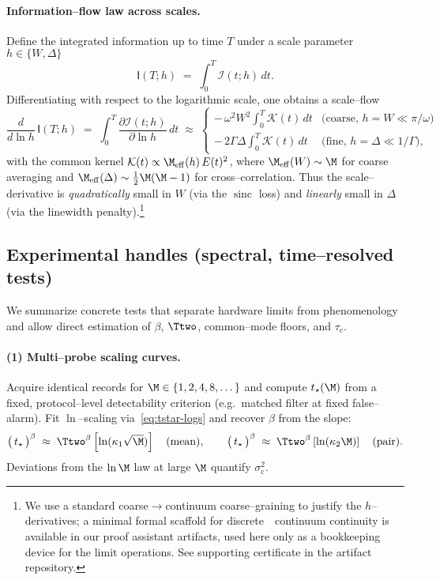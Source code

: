 \documentclass[12pt,a4paper]{article}
\theoremstyle{definition}
\theoremstyle{remark}
\begin{document}
\paragraph{Information--flow law across scales.}
Define the integrated information up to time \(T\) under a scale parameter \(h\in\{W,\Delta\}\)
\begin{equation}
\mathsf{I}(T;h)
\;=\;
\int_0^T \mathcal{I}(t;h)\,dt.
\end{equation}
Differentiating with respect to the logarithmic scale, one obtains a scale--flow
\begin{equation}
\frac{d}{d\ln h}\,\mathsf{I}(T;h)
\;=\;
\int_0^T \frac{\partial \mathcal{I}(t;h)}{\partial\ln h}\,dt
\;\approx\;
\begin{cases}
-\,\omega^2 W^2 \int_0^T \mathcal{K}(t)\,dt & \text{(coarse, \(h=W\ll \pi/\omega\))}\\[3pt]
-\,2\Gamma \Delta \int_0^T \mathcal{K}(t)\,dt & \text{(fine, \(h=\Delta\ll 1/\Gamma\)),}
\end{cases}
\label{eq:info-flow}
\end{equation}
with the common kernel \(\mathcal{K}(t)\propto \M_{\mathrm{eff}}(h)\,E(t)^2\), where \(\M_{\mathrm{eff}}(W)\sim \M\) for coarse averaging and \(\M_{\mathrm{eff}}(\Delta)\sim \tfrac{1}{2}\M(\M-1)\) for cross--correlation. Thus the scale--derivative is \emph{quadratically} small in \(W\) (via the \(\operatorname{sinc}\) loss) and \emph{linearly} small in \(\Delta\) (via the linewidth penalty).\footnote{We use a standard coarse\(\to\)continuum coarse--graining to justify the \(h\)--derivatives; a minimal formal scaffold for discrete~\to~continuum continuity is available in our proof assistant artifacts, used here only as a bookkeeping device for the limit operations. See supporting certificate in the artifact repository.}

\subsection{Experimental handles (spectral, time--resolved tests)}
\label{sec:8.4}

We summarize concrete tests that separate hardware limits from phenomenology and allow direct estimation of \(\beta\), \(\Ttwo\), common--mode floors, and \(\tau_{\mathrm{c}}\).

\paragraph{(1) Multi--probe scaling curves.}
Acquire identical records for \(\M\in\{1,2,4,8,\dots\}\) and compute \(t_\star(\M)\) from a fixed, protocol--level detectability criterion (e.g.\ matched filter at fixed false--alarm). Fit \(\ln\)--scaling via~\eqref{eq:tstar-logs} and recover \(\beta\) from the slope:
\[
\big(\,t_\star\,\big)^{\beta}\;\approx\;\Ttwo^{\beta}\left[\ln(\kappa_1 \sqrt{\M})\right] \quad\text{(mean)}, 
\qquad
\big(\,t_\star\,\big)^{\beta}\;\approx\;\Ttwo^{\beta}\left[\ln(\kappa_2 {\M})\right] \quad\text{(pair)}.
\]
Deviations from the \(\ln \M\) law at large \(\M\) quantify \(\sigma_{\mathrm{c}}^2\).
\end{document}
